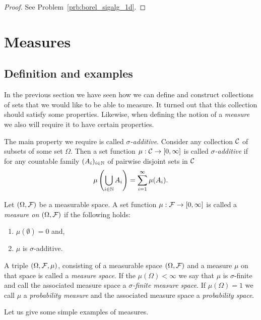 \begin{proof}
See Problem~\ref{prb:borel_sigalg_1d}.
\end{proof}

\section{Measures}

\subsection{Definition and examples}
In the previous section we have seen how we can define and construct collections of sets that we would like to be able to measure. It turned out that this collection should satisfy some properties. Likewise, when defining the notion of a \emph{measure} we also will require it to have certain properties.

The main property we require is called \emph{$\sigma$-additive}. Consider any collection $\mathcal C$ of subsets of some set $\Omega$. Then a set function $\mu : \mathcal C \to [0,\infty]$ is called \emph{$\sigma$-additive} if for any countable family $(A_i)_{i \in \mathbb N}$ of pairwise disjoint sets in $\mathcal C$
\[
	\mu\left(\bigcup_{i \in \mathbb N} A_i\right) = \sum_{i = 1}^\infty \mu(A_i).
\]

\begin{definition}[Measure]\label{def:measure}
Let $(\Omega, \mathcal F)$ be a measurable space. A set function $\mu : \mathcal F \to [0,\infty]$ is called a \emph{measure on $(\Omega, \mathcal F)$} if the following holds:
\begin{enumerate}
\item $\mu(\emptyset) = 0$ and,
\item $\mu$ is $\sigma$-additive.
\end{enumerate}
\end{definition}

A triple $(\Omega, \mathcal F, \mu)$, consisting of a measurable space $(\Omega, \mathcal F)$ and a measure $\mu$ on that space is called a \emph{measure space}. If the $\mu(\Omega) < \infty$ we say that $\mu$ is $\sigma$-finite and call the associated measure space a \emph{$\sigma$-finite measure space}. If $\mu(\Omega) = 1$ we call $\mu$ a \emph{probability measure} and the associated measure space a \emph{probability space}.

Let us give some simple examples of measures.

